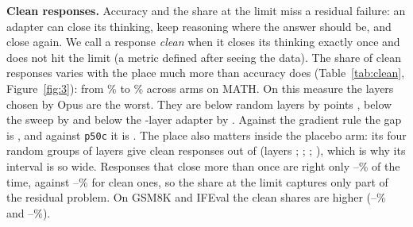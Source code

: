 \documentclass[11pt]{article}
\newcommand{\fitwidth}[1]{\resizebox{\ifdim\width>\linewidth\linewidth\else\width\fi}{!}{#1}}
\begin{document}
\begin{table}[htbp]
\centering
\caption{Exploratory comparisons on MATH at $T=\TempMain$ among arms that differ only in their layers, and of each four-layer arm against (a). Source: \texttt{revision/rev\_comparaciones.csv}, \texttt{revision/rev\_holm.csv}.}\label{tab:explore}
\footnotesize\setlength{\tabcolsep}{4pt}
\fitwidth{}
\end{table}

\textbf{Clean responses.} Accuracy and the share at the limit miss a residual failure: an adapter can close its thinking, keep reasoning where the answer should be, and close again. We call a response \emph{clean} when it closes its thinking exactly once and does not hit the limit (a metric defined after seeing the data). The share of clean responses varies with the place much more than accuracy does (Table~\ref{tab:clean}, Figure~\ref{fig:3}): from \% to \% across arms on MATH. On this measure the layers chosen by Opus are the worst. They are below random layers by  points , below the sweep by   and below the \NLayersFull{}-layer adapter by  . Against the gradient rule the gap is  , and against \texttt{p50c} it is  . The place also matters inside the placebo arm: its four random groups of layers give  clean responses out of \NMath{} (layers ; ; ; ), which is why its interval is so wide. Responses that close more than once are right only --\% of the time, against --\% for clean ones, so the share at the limit captures only part of the residual problem. On GSM8K and IFEval the clean shares are higher (--\% and --\%).

\begin{table}[htbp]
\centering
\caption{Exploratory: clean responses (exactly one close of thinking, not at the limit) on MATH at $T=\TempMain$. Two-way 95\% intervals. Source: \texttt{revision/rev\_respuestas\_limpias.csv}.}\label{tab:clean}
\footnotesize\setlength{\tabcolsep}{4pt}
\fitwidth{}
\end{table}
\end{document}

